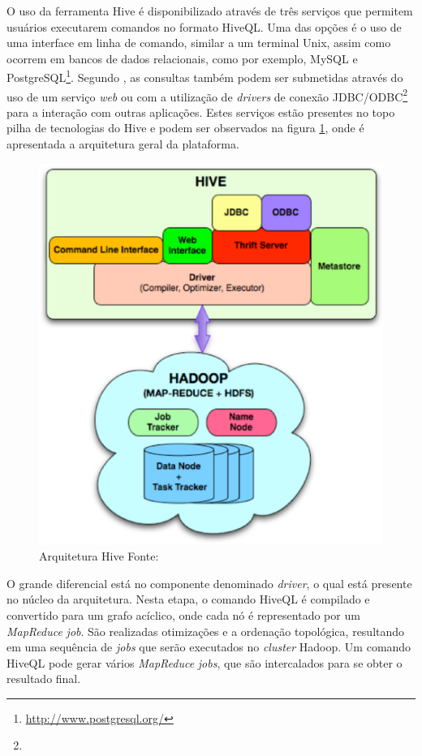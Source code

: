 O uso da ferramenta Hive é disponibilizado através de três serviços que permitem usuários executarem comandos no formato HiveQL. Uma das opções é o uso de uma interface em linha de comando, similar a um terminal Unix, assim como ocorrem em bancos de dados relacionais, como por exemplo, MySQL e PostgreSQL\footnote{\url{http://www.postgresql.org/}}. Segundo , as consultas também podem ser submetidas através do uso de um serviço \textit{web} ou com a utilização de \textit{drivers} de conexão JDBC/ODBC\footnote{} para a interação com outras aplicações. Estes serviços estão presentes no topo pilha de tecnologias do Hive e podem ser observados na figura \ref{fig-hive}, onde é apresentada a arquitetura geral da plataforma.

\begin{figure}[ht!]
	\centering
	\includegraphics[keepaspectratio=true,scale=0.5]
	  {figuras/hive.eps}
	\caption[Arquitetura Hive]{Arquitetura Hive
	\protect\linebreak Fonte: \cite{thusoo2009}}
	\label{fig-hive}
\end{figure}
\FloatBarrier

O grande diferencial está no componente denominado \textit{driver}, o qual está presente no núcleo da arquitetura. Nesta etapa, o comando HiveQL é compilado e convertido para um grafo acíclico, onde cada nó é representado por um \textit{MapReduce} \textit{job}. São realizadas otimizações e a ordenação topológica, resultando em uma sequência de \textit{jobs} que serão executados no \textit{cluster} Hadoop. Um comando HiveQL pode gerar vários \textit{MapReduce} \textit{jobs}, que são intercalados para se obter o resultado final.



